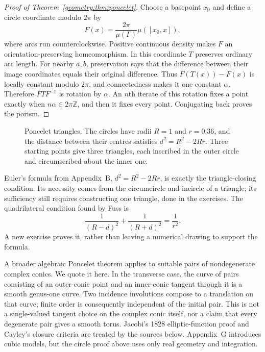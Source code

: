 \begin{proof}[Proof of Theorem~\ref{geometry:thm:poncelet}]
Choose a basepoint $x_0$ and define a circle coordinate modulo $2\pi$ by
\[
F(x)=\frac{2\pi}{\mu(\Gamma)}\mu([x_0,x]),
\]
where arcs run counterclockwise. Positive continuous density makes $F$ an orientation-preserving homeomorphism. In this coordinate $T$ preserves ordinary arc length. For nearby $a,b$, preservation says that the difference between their image coordinates equals their original difference. Thus $F(T(x))-F(x)$ is locally constant modulo $2\pi$, and connectedness makes it one constant $\alpha$. Therefore $FTF^{-1}$ is rotation by $\alpha$. An $n$th iterate of this rotation fixes a point exactly when $n\alpha\in2\pi\mathbb Z$, and then it fixes every point. Conjugating back proves the porism.
\end{proof}

\begin{figure}[ht]
\centering
{}
\caption{Poncelet triangles. The circles have radii $R=1$ and $r=0.36$, and the distance between their centres satisfies $d^2=R^2-2Rr$. Three
starting points give three triangles, each inscribed in the outer circle and circumscribed about the inner one.}
\label{geometry:fig:poncelet}
\end{figure}

Euler's formula from Appendix~B, $d^2=R^2-2Rr$, is exactly the triangle-closing condition. Its necessity comes from the circumcircle and incircle of a triangle; its sufficiency still requires constructing one triangle, done in the exercises. The quadrilateral condition found by Fuss is
\[
\frac1{(R-d)^2}+\frac1{(R+d)^2}=\frac1{r^2}.
\]
A new exercise proves it, rather than leaving a numerical drawing to support the formula.

\begin{remark}
A broader algebraic Poncelet theorem applies to suitable pairs of nondegenerate complex conics. We quote it here. In the transverse case, the curve of pairs consisting of an outer-conic point and an inner-conic tangent through it is a smooth genus-one curve. Two incidence involutions compose to a translation on that curve; finite order is consequently independent of the initial pair. This is not a single-valued tangent choice on the complex conic itself, nor a claim that every degenerate pair gives a smooth torus. Jacobi's 1828 elliptic-function proof and Cayley's closure criteria are treated by the sources below. Appendix~G introduces cubic models, but the circle proof above uses only real geometry and integration.
\end{remark}

